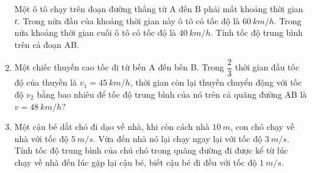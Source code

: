 \begin{enumerate}[label=\bfseries Bài \arabic*:]
{		Một ô tô chạy trên đoạn đường thẳng từ A đến B phải mất khoảng thời gian $t$. Trong nửa đầu của khoảng thời gian này ô tô có tốc độ là $\SI{60}{km/h}$. Trong nửa khoảng thời gian cuối ô tô có tốc độ là $\SI{40}{km/h}$. Tính tốc độ trung bình trên cả đoạn AB.
	}
	\item {}
	
	{
		
		Một chiếc thuyền cao tốc đi từ bến A đến bến B. Trong $\dfrac{2}{3}$ thời gian đầu tốc độ của thuyền là $v_1 = \SI{45}{km/h}$, thời gian còn lại thuyền chuyển động với tốc độ $v_2$ bằng bao nhiêu để tốc độ trung bình của nó trên cả quãng đường AB là $v = \SI{48}{km/h}$?
		
	}
	\item {}
	
	{
		Một cậu bé dắt chó đi dạo về nhà, khi còn cách nhà $\SI{10}{m}$, con chó chạy về nhà với tốc độ $\SI{5}{m/s}$. Vừa đến nhà nó lại chạy ngay lại với tốc độ $\SI{3}{m/s}$. Tính tốc độ trung bình của chú chó trong quãng đường đi được kể từ lúc chạy về nhà đến lúc gặp lại cậu bé, biết cậu bé đi đều với tốc độ $\SI{1}{m/s}$.
	}
\end{enumerate}
